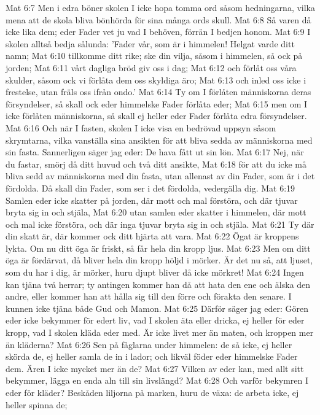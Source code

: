 Mat 6:7  Men i edra böner skolen I icke hopa tomma ord såsom hedningarna, vilka mena att de skola bliva bönhörda för sina många ords skull.
Mat 6:8  Så varen då icke lika dem; eder Fader vet ju vad I behöven, förrän I bedjen honom.
Mat 6:9  I skolen alltså bedja sålunda: 'Fader vår, som är i himmelen! Helgat varde ditt namn;
Mat 6:10  tillkomme ditt rike; ske din vilja, såsom i himmelen, så ock på jorden;
Mat 6:11  vårt dagliga bröd giv oss i dag;
Mat 6:12  och förlåt oss våra skulder, såsom ock vi förlåta dem oss skyldiga äro;
Mat 6:13  och inled oss icke i frestelse, utan fräls oss ifrån ondo.'
Mat 6:14  Ty om I förlåten människorna deras försyndelser, så skall ock eder himmelske Fader förlåta eder;
Mat 6:15  men om I icke förlåten människorna, så skall ej heller eder Fader förlåta edra försyndelser.
Mat 6:16  Och när I fasten, skolen I icke visa en bedrövad uppsyn såsom skrymtarna, vilka vanställa sina ansikten för att bliva sedda av människorna med sin fasta. Sannerligen säger jag eder: De hava fått ut sin lön.
Mat 6:17  Nej, när du fastar, smörj då ditt huvud och två ditt ansikte,
Mat 6:18  för att du icke må bliva sedd av människorna med din fasta, utan allenast av din Fader, som är i det fördolda. Då skall din Fader, som ser i det fördolda, vedergälla dig.
Mat 6:19  Samlen eder icke skatter på jorden, där mott och mal förstöra, och där tjuvar bryta sig in och stjäla,
Mat 6:20  utan samlen eder skatter i himmelen, där mott och mal icke förstöra, och där inga tjuvar bryta sig in och stjäla.
Mat 6:21  Ty där din skatt är, där kommer ock ditt hjärta att vara.
Mat 6:22  Ögat är kroppens lykta. Om nu ditt öga är friskt, så får hela din kropp ljus.
Mat 6:23  Men om ditt öga är fördärvat, då bliver hela din kropp höljd i mörker. Är det nu så, att ljuset, som du har i dig, är mörker, huru djupt bliver då icke mörkret!
Mat 6:24  Ingen kan tjäna två herrar; ty antingen kommer han då att hata den ene och älska den andre, eller kommer han att hålla sig till den förre och förakta den senare. I kunnen icke tjäna både Gud och Mamon.
Mat 6:25  Därför säger jag eder: Gören eder icke bekymmer för edert liv, vad I skolen äta eller dricka, ej heller för eder kropp, vad I skolen kläda eder med. Är icke livet mer än maten, och kroppen mer än kläderna?
Mat 6:26  Sen på fåglarna under himmelen: de så icke, ej heller skörda de, ej heller samla de in i lador; och likväl föder eder himmelske Fader dem. Ären I icke mycket mer än de?
Mat 6:27  Vilken av eder kan, med allt sitt bekymmer, lägga en enda aln till sin livslängd?
Mat 6:28  Och varför bekymren I eder för kläder? Beskåden liljorna på marken, huru de växa: de arbeta icke, ej heller spinna de;
